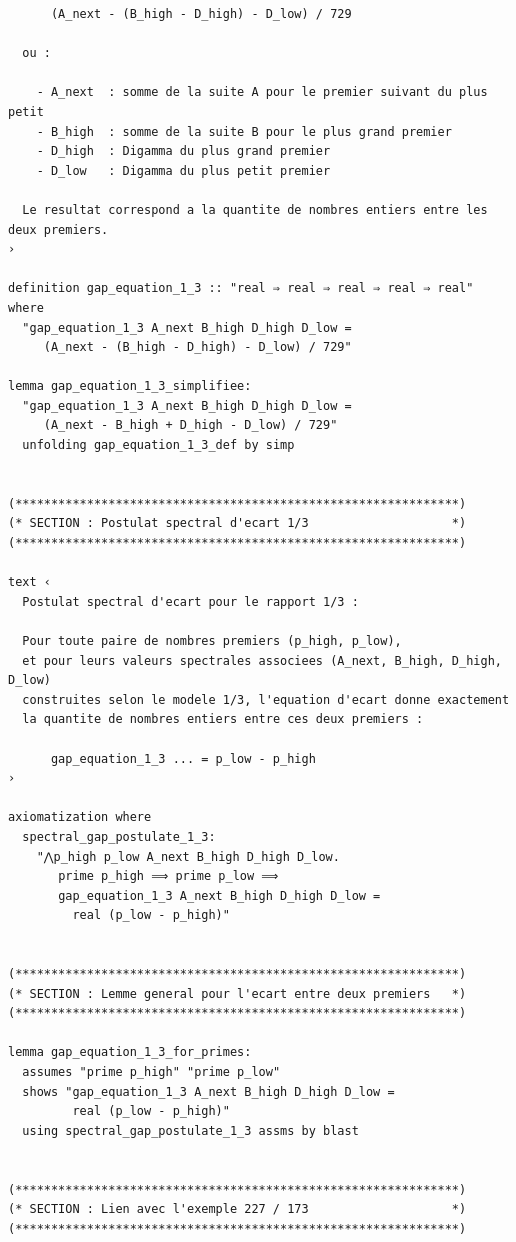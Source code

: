 \documentclass[a4paper,11pt]{article}
\begin{document}
\begin{holcode}[title={\textcolor{white}{File: methode\_spectral.thy -- Part 1/4}}]
\begin{lstlisting}
      (A_next - (B_high - D_high) - D_low) / 729

  ou :

    - A_next  : somme de la suite A pour le premier suivant du plus petit
    - B_high  : somme de la suite B pour le plus grand premier
    - D_high  : Digamma du plus grand premier
    - D_low   : Digamma du plus petit premier

  Le resultat correspond a la quantite de nombres entiers entre les deux premiers.
›

definition gap_equation_1_3 :: "real ⇒ real ⇒ real ⇒ real ⇒ real" where
  "gap_equation_1_3 A_next B_high D_high D_low =
     (A_next - (B_high - D_high) - D_low) / 729"

lemma gap_equation_1_3_simplifiee:
  "gap_equation_1_3 A_next B_high D_high D_low =
     (A_next - B_high + D_high - D_low) / 729"
  unfolding gap_equation_1_3_def by simp


(**************************************************************)
(* SECTION : Postulat spectral d'ecart 1/3                    *)
(**************************************************************)

text ‹
  Postulat spectral d'ecart pour le rapport 1/3 :

  Pour toute paire de nombres premiers (p_high, p_low),
  et pour leurs valeurs spectrales associees (A_next, B_high, D_high, D_low)
  construites selon le modele 1/3, l'equation d'ecart donne exactement
  la quantite de nombres entiers entre ces deux premiers :

      gap_equation_1_3 ... = p_low - p_high
›

axiomatization where
  spectral_gap_postulate_1_3:
    "⋀p_high p_low A_next B_high D_high D_low.
       prime p_high ⟹ prime p_low ⟹
       gap_equation_1_3 A_next B_high D_high D_low =
         real (p_low - p_high)"


(**************************************************************)
(* SECTION : Lemme general pour l'ecart entre deux premiers   *)
(**************************************************************)

lemma gap_equation_1_3_for_primes:
  assumes "prime p_high" "prime p_low"
  shows "gap_equation_1_3 A_next B_high D_high D_low =
         real (p_low - p_high)"
  using spectral_gap_postulate_1_3 assms by blast


(**************************************************************)
(* SECTION : Lien avec l'exemple 227 / 173                    *)
(**************************************************************)


\end{lstlisting}
\end{holcode}
\end{document}
